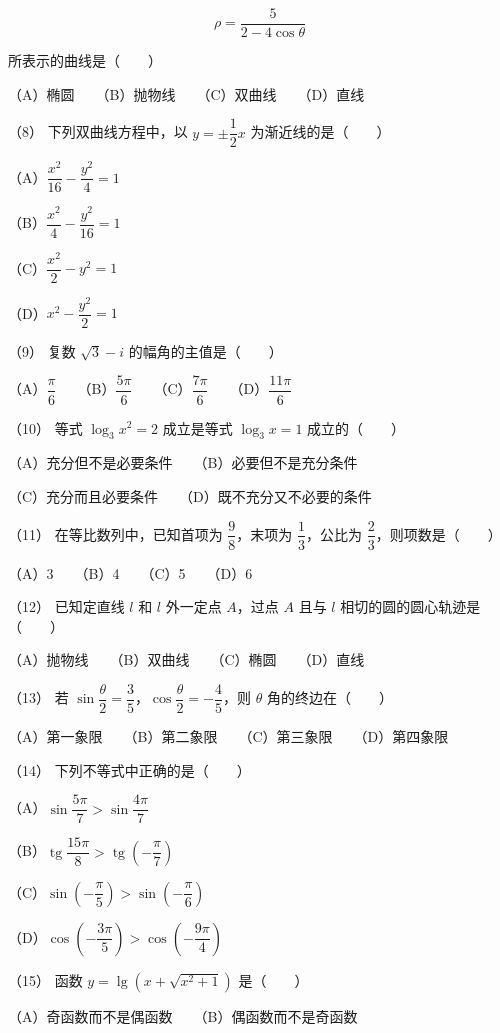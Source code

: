 \begin{question}
\nopagebreak[4]
\[
\rho=\frac5{2-4\cos\theta}
\]

所表示的曲线是\mbox{（　　）}

（A）椭圆　　（B）抛物线　　（C）双曲线　　（D）直线

（8） 下列双曲线方程中，以 $y=\pm\dfrac12x$ 为渐近线的是\mbox{（　　）}

（A）$\dfrac{x^2}{16}-\dfrac{y^2}{4}=1$

（B）$\dfrac{x^2}{4}-\dfrac{y^2}{16}=1$

（C）$\dfrac{x^2}{2}-y^2=1$

（D）$x^2-\dfrac{y^2}{2}=1$

（9） 复数 $\sqrt3-i$ 的幅角的主值是\mbox{（　　）}

（A）$\dfrac\pi6$　　（B）$\dfrac{5\pi}6$　　（C）$\dfrac{7\pi}6$　　（D）$\dfrac{11\pi}6$

（10） 等式 $\log_3x^2=2$ 成立是等式 $\log_3x=1$ 成立的\mbox{（　　）}

（A）充分但不是必要条件　　（B）必要但不是充分条件

（C）充分而且必要条件　　（D）既不充分又不必要的条件

（11） 在等比数列中，已知首项为 $\dfrac98$，末项为 $\dfrac13$，公比为 $\dfrac23$，则项数是\mbox{（　　）}

（A）3　　（B）4　　（C）5　　（D）6

（12） 已知定直线 $l$ 和 $l$ 外一定点 $A$，过点 $A$ 且与 $l$ 相切的圆的圆心轨迹是\mbox{（　　）}

（A）抛物线　　（B）双曲线　　（C）椭圆　　（D）直线

（13） 若 $\sin\dfrac\theta2=\dfrac35$，$\cos\dfrac\theta2=-\dfrac45$，则 $\theta$ 角的终边在\mbox{（　　）}

（A）第一象限　　（B）第二象限　　（C）第三象限　　（D）第四象限

（14） 下列不等式中正确的是\mbox{（　　）}

（A）$\sin\dfrac{5\pi}7>\sin\dfrac{4\pi}7$

（B）$\operatorname{tg}\dfrac{15\pi}8>\operatorname{tg}\left(-\dfrac\pi7\right)$

（C）$\sin\left(-\dfrac\pi5\right)>\sin\left(-\dfrac\pi6\right)$

（D）$\cos\left(-\dfrac{3\pi}5\right)>\cos\left(-\dfrac{9\pi}4\right)$

（15） 函数 $y=\lg\left(x+\sqrt{x^2+1}\right)$ 是\mbox{（　　）}

（A）奇函数而不是偶函数　　（B）偶函数而不是奇函数


\end{question}
